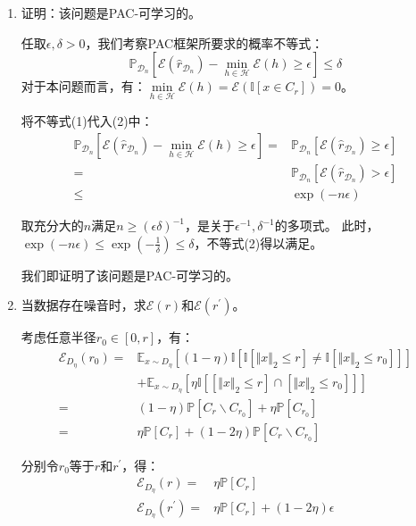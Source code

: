 \documentclass[12pt, a4paper]{article}
\newcommand{\under}[1]{\mathop{#1}\limits_}
\newcommand{\norm}[1]{{\Vert #1 \Vert_2}}
\newcommand{\expect}{{\mathbb{E}}}
\newcommand{\unit}{{\mathbb{I}}}
\newcommand{\prob}{{\mathbb{P}}}
\newcommand{\EE}{{\mathcal{E}}}
\newcommand{\HH}{{\mathcal{H}}}
\newcommand{\DD}{{\mathcal{D}}}
\newcommand{\rh}{{\widehat{r}}}
\newcommand{\rp}{{r^\prime}}
\begin{document}
\begin{enumerate}
        由指数函数的凸性，对任意$x \in \mathbb{R}$，$1 - x \le e^{-x}$恒成立，于是：
        \begin{equation}
        \prob_{\DD_n}[\EE(\rh_{\DD_n}) > \epsilon] \le 1 - n \epsilon \le \exp(-n \epsilon)
        \end{equation}

    \item 证明：该问题是PAC-可学习的。

        任取$\epsilon, \delta > 0$，我们考察PAC框架所要求的概率不等式：
        \begin{equation}
        \prob_{\DD_n}[\EE(\rh_{\DD_n}) - \under{\min}{h \in \HH} \EE(h) \ge \epsilon] \le \delta
        \end{equation}
        对于本问题而言，有：$\under{\min}{h \in \HH} \EE(h) = \EE(\unit[x \in C_r]) = 0$。

        将不等式(1)代入(2)中：
        \begin{align*}
        \prob_{\DD_n}[\EE(\rh_{\DD_n}) - \under{\min}{h \in \HH} \EE(h) \ge \epsilon]
        =& \prob_{\DD_n}[\EE(\rh_{\DD_n}) \ge \epsilon] \\
        =& \prob_{\DD_n}[\EE(\rh_{\DD_n}) > \epsilon] \\
        \le& \exp(-n \epsilon)
        \end{align*}

        取充分大的$n$满足$n \ge (\epsilon \delta)^{-1}$，是关于$\epsilon^{-1}, \delta^{-1}$的多项式。
        此时，$\exp(-n \epsilon) \le \exp(-\frac{1}{\delta}) \le \delta$，不等式(2)得以满足。

        我们即证明了该问题是PAC-可学习的。

    \item 当数据存在噪音时，求$\EE(r)$和$\EE(\rp)$。

        考虑任意半径$r_0 \in [0, r]$，有：
        \begin{align*}
        \EE_{D_\eta}(r_0)
        =& \expect_{x \sim D_\eta} [(1 - \eta) \unit[\unit[\norm{x} \le r] \ne \unit[\norm{x} \le r_0]]] \\
        &+ \expect_{x \sim D_\eta} [\eta \unit[[\norm{x} \le r] \cap [\norm{x} \le r_0]]] \\
        =& (1 - \eta) \prob[C_r \backslash C_{r_0}] + \eta \prob[C_{r_0}] \\
        =& \eta \prob[C_r] + (1 - 2 \eta) \prob[C_r \backslash C_{r_0}]
        \end{align*}

        分别令$r_0$等于$r$和$\rp$，得：
        \begin{align}
        \EE_{D_\eta}(r) =& \eta \prob[C_r] \\
        \EE_{D_\eta}(\rp) =& \eta \prob[C_r] + (1 - 2 \eta) \epsilon
        \end{align}


\end{enumerate}
\end{document}
